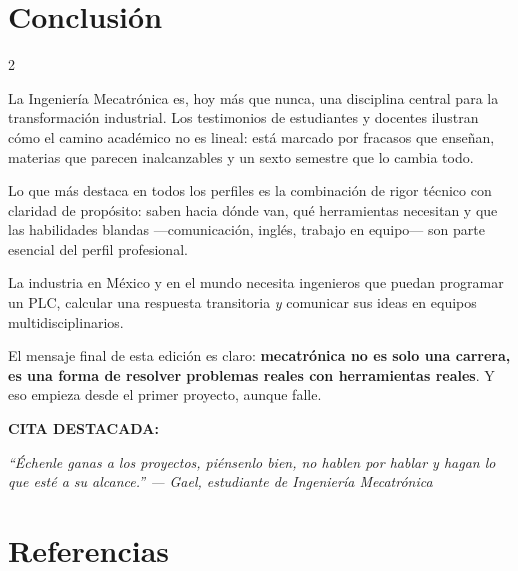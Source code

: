 \documentclass[10pt]{article}
\newenvironment{citaRevista}{%
  \begin{tcolorbox}[colback=azulOscuro,colframe=naranja,
    arc=0pt,boxrule=1.2pt,left=8pt,right=8pt,top=6pt,bottom=6pt]
  \centering\small\bfseries\color{blanco}CITA DESTACADA:\par
  \vspace{3pt}\itshape\normalsize\color{grisTexto}}{\end{tcolorbox}}
\begin{document}
\section*{Conclusión}

\begin{multicols}{2}
\RaggedRight\small\color{textoGris}

La Ingenier\'ia Mecatr\'onica es, hoy m\'as que nunca, una
disciplina central para la transformaci\'on industrial. Los
testimonios de estudiantes y docentes ilustran c\'omo el camino
acad\'emico no es lineal: est\'a marcado por fracasos que
ense\~nan, materias que parecen inalcanzables y un sexto semestre
que lo cambia todo.

\vspace{4pt}
Lo que m\'as destaca en todos los perfiles es la combinaci\'on de
rigor t\'ecnico con claridad de prop\'osito: saben hacia d\'onde
van, qu\'e herramientas necesitan y que las habilidades blandas
—comunicaci\'on, ingl\'es, trabajo en equipo— son parte esencial
del perfil profesional.

\columnbreak

La industria en M\'exico y en el mundo necesita ingenieros que
puedan programar un PLC, calcular una respuesta transitoria
\textit{y} comunicar sus ideas en equipos multidisciplinarios.

\vspace{4pt}
El mensaje final de esta edici\'on es claro:
\textbf{\color{naranja}mecatr\'onica no es solo una carrera,
es una forma de resolver problemas reales con herramientas
reales}. Y eso empieza desde el primer proyecto, aunque falle.

\end{multicols}

\vspace{8pt}
\begin{citaRevista}
``\'Echenle ganas a los proyectos, pi\'ensenlo bien, no hablen
por hablar y hagan lo que est\'e a su alcance.''
— Gael, estudiante de Ingenier\'ia Mecatr\'onica
\end{citaRevista}

\newpage

\section*{Referencias}
\end{document}
